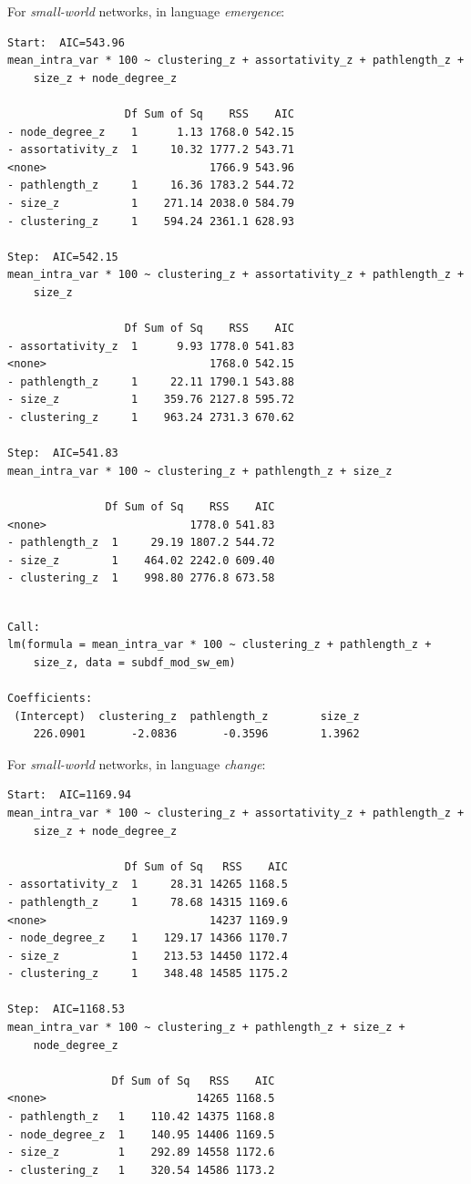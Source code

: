 \documentclass[
]{article}
\begin{document}
For \emph{small-world} networks, in language \emph{emergence}:

\begin{verbatim}
Start:  AIC=543.96
mean_intra_var * 100 ~ clustering_z + assortativity_z + pathlength_z + 
    size_z + node_degree_z

                  Df Sum of Sq    RSS    AIC
- node_degree_z    1      1.13 1768.0 542.15
- assortativity_z  1     10.32 1777.2 543.71
<none>                         1766.9 543.96
- pathlength_z     1     16.36 1783.2 544.72
- size_z           1    271.14 2038.0 584.79
- clustering_z     1    594.24 2361.1 628.93

Step:  AIC=542.15
mean_intra_var * 100 ~ clustering_z + assortativity_z + pathlength_z + 
    size_z

                  Df Sum of Sq    RSS    AIC
- assortativity_z  1      9.93 1778.0 541.83
<none>                         1768.0 542.15
- pathlength_z     1     22.11 1790.1 543.88
- size_z           1    359.76 2127.8 595.72
- clustering_z     1    963.24 2731.3 670.62

Step:  AIC=541.83
mean_intra_var * 100 ~ clustering_z + pathlength_z + size_z

               Df Sum of Sq    RSS    AIC
<none>                      1778.0 541.83
- pathlength_z  1     29.19 1807.2 544.72
- size_z        1    464.02 2242.0 609.40
- clustering_z  1    998.80 2776.8 673.58
\end{verbatim}

\begin{verbatim}

Call:
lm(formula = mean_intra_var * 100 ~ clustering_z + pathlength_z + 
    size_z, data = subdf_mod_sw_em)

Coefficients:
 (Intercept)  clustering_z  pathlength_z        size_z  
    226.0901       -2.0836       -0.3596        1.3962  
\end{verbatim}

For \emph{small-world} networks, in language \emph{change}:

\begin{verbatim}
Start:  AIC=1169.94
mean_intra_var * 100 ~ clustering_z + assortativity_z + pathlength_z + 
    size_z + node_degree_z

                  Df Sum of Sq   RSS    AIC
- assortativity_z  1     28.31 14265 1168.5
- pathlength_z     1     78.68 14315 1169.6
<none>                         14237 1169.9
- node_degree_z    1    129.17 14366 1170.7
- size_z           1    213.53 14450 1172.4
- clustering_z     1    348.48 14585 1175.2

Step:  AIC=1168.53
mean_intra_var * 100 ~ clustering_z + pathlength_z + size_z + 
    node_degree_z

                Df Sum of Sq   RSS    AIC
<none>                       14265 1168.5
- pathlength_z   1    110.42 14375 1168.8
- node_degree_z  1    140.95 14406 1169.5
- size_z         1    292.89 14558 1172.6
- clustering_z   1    320.54 14586 1173.2
\end{verbatim}
\end{document}
